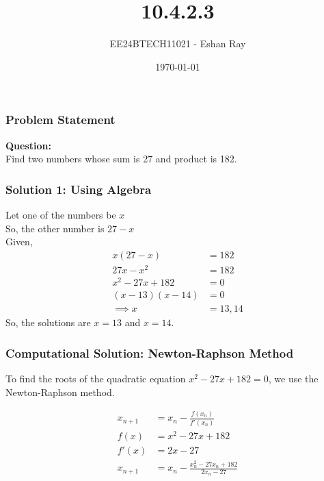 \documentclass{beamer}
\title{10.4.2.3}
\author{EE24BTECH11021 - Eshan Ray}
\date{\today}
\providecommand{\brak}[1]{\ensuremath{\left(#1\right)}}
\theoremstyle{remark}
\begin{document}
\begin{frame}
    \titlepage
\end{frame}

\begin{frame}
    \frametitle{Problem Statement}
    \textbf{Question:}\\
    Find two numbers whose sum is 27 and product is 182.
\end{frame}

\begin{frame}
    \frametitle{Solution 1: Using Algebra}
  Let one of the numbers be $x$\\
So, the other number is $27-x$\\
Given,
\begin{align}
    x\brak{27-x} &= 182\\
    27x-x^2 &=182\\
    x^2 - 27x + 182 &=0\\
    \brak{x-13}\brak{x-14} &= 0\\
    \implies    x &= 13,14
\end{align}
    So, the solutions are \( x = 13 \) and \( x = 14 \).
\end{frame}

\begin{frame}
    \frametitle{Computational Solution: Newton-Raphson Method}
    To find the roots of the quadratic equation \( x^2 - 27x + 182 = 0 \), we use the Newton-Raphson method.

\begin{align}
    x_{n+1} &= x_n - \frac{f\brak{x_n}}{f\prime\brak{x_n}}\\
    f\brak{x} &= x^2 - 27x +182\\
    f\prime\brak{x} &= 2x - 27\\
    x_{n+1} &= x_n - \frac{x_{n}^2-27x_n+182}{2x_n-27}
\end{align}
\end{frame}
\end{document}
